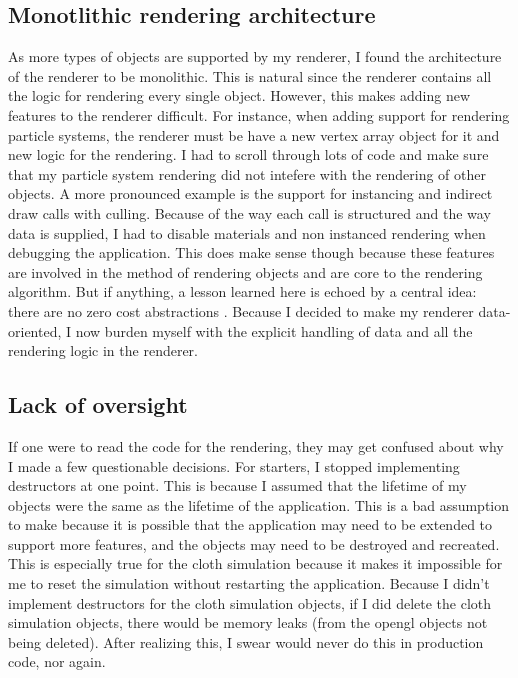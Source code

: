 \documentclass[letterpaper, 10 pt, conference]{ieeeconf}  %
\begin{document}
\subsection{Monotlithic rendering architecture}
As more types of objects are supported by my renderer, I found the architecture of the renderer to be monolithic. This is natural since the renderer contains all the logic for rendering every single object. However, this makes adding new features to the renderer difficult. For instance, when adding support for rendering particle systems, the renderer must be have a new vertex array object for it and new logic for the rendering. I had to scroll through lots of code and make sure that my particle system rendering did not intefere with the rendering of other objects. A more pronounced example is the support for instancing and indirect draw calls with culling. Because of the way each call is structured and the way data is supplied, I had to disable materials and non instanced rendering when debugging the application. This does make sense though because these features are involved in the method of rendering objects and are core to the rendering algorithm. But if anything, a lesson learned here is echoed by a central idea: there are no zero cost abstractions \cite{caruth2019}. Because I decided to make my renderer data-oriented, I now burden myself with the explicit handling of data and all the rendering logic in the renderer. 

\subsection{Lack of oversight}
If one were to read the code for the rendering, they may get confused about why I made a few questionable decisions. For starters, I stopped implementing destructors at one point. This is because I assumed that the lifetime of my objects were the same as the lifetime of the application. This is a bad assumption to make because it is possible that the application may need to be extended to support more features, and the objects may need to be destroyed and recreated. This is especially true for the cloth simulation because it makes it impossible for me to reset the simulation without restarting the application. Because I didn't implement destructors for the cloth simulation objects, if I did delete the cloth simulation objects, there would be memory leaks (from the opengl objects not being deleted). After realizing this, I swear would never do this in production code, nor again. 
\end{document}
